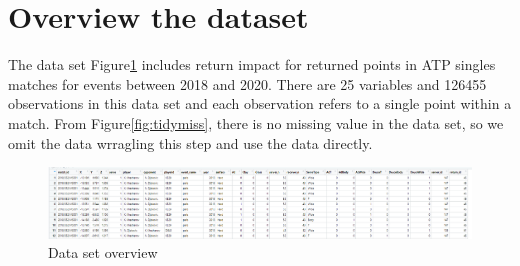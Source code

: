 \documentclass[11pt,a4paper,]{article}
\begin{document}
\hypertarget{overview-the-dataset}{%
\section{Overview the dataset}\label{overview-the-dataset}}

The data set Figure\ref{fig:datset} includes return impact for returned points in ATP singles matches for events between 2018 and 2020. There are 25 variables and 126455 observations in this data set and each observation refers to a single point within a match. From Figure\ref{fig:tidymiss}, there is no missing value in the data set, so we omit the data wrragling this step and use the data directly.

\begin{figure}
\includegraphics[width=1\linewidth]{image/dataset} \caption{Data set overview}\label{fig:datset}
\end{figure}
\end{document}
